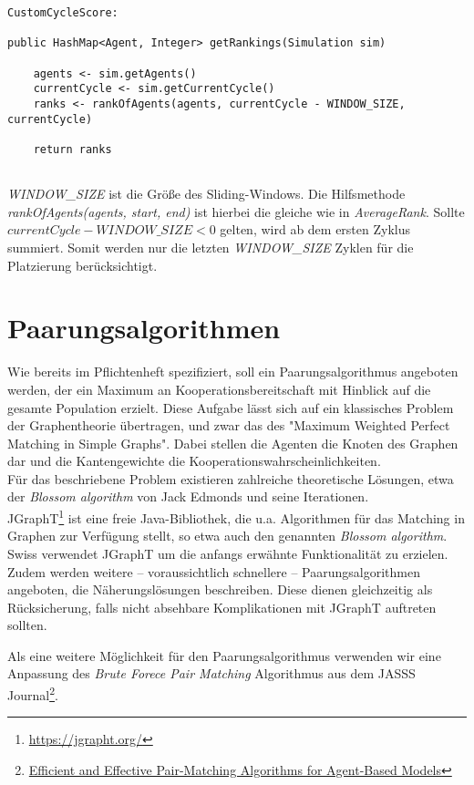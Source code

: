 \begin{lstlisting}
CustomCycleScore:

public HashMap<Agent, Integer> getRankings(Simulation sim) 
	
	agents <- sim.getAgents()
	currentCycle <- sim.getCurrentCycle()
	ranks <- rankOfAgents(agents, currentCycle - WINDOW_SIZE, currentCycle)
	
	return ranks
	
\end{lstlisting}
\emph{WINDOW\_SIZE} ist die Größe des Sliding-Windows. Die Hilfsmethode \emph{rankOfAgents(agents, start, end)} ist hierbei die gleiche wie in \emph{AverageRank}. Sollte $currentCycle - WINDOW\_SIZE < 0$ gelten, wird ab dem ersten Zyklus summiert. Somit werden nur die letzten \emph{WINDOW\_SIZE} Zyklen für die Platzierung berücksichtigt. 


\section{Paarungsalgorithmen}

Wie bereits im Pflichtenheft spezifiziert, soll ein Paarungsalgorithmus angeboten werden, der ein Maximum an Kooperationsbereitschaft mit Hinblick auf die gesamte Population erzielt. Diese Aufgabe lässt sich auf ein klassisches Problem der Graphentheorie übertragen, und zwar das des "Maximum Weighted Perfect Matching in Simple Graphs". Dabei stellen die Agenten die Knoten des Graphen dar und die Kantengewichte die Kooperationswahrscheinlichkeiten.\\
Für das beschriebene Problem existieren zahlreiche theoretische Lösungen, etwa der \emph{Blossom algorithm} von Jack Edmonds und seine Iterationen.\\
JGraphT\footnote{\href{https://jgrapht.org/}{https://jgrapht.org/}} ist eine freie Java-Bibliothek, die u.a. Algorithmen für das Matching in Graphen zur Verfügung stellt, so etwa auch den genannten \emph{Blossom algorithm}.\\
Swiss verwendet JGraphT um die anfangs erwähnte Funktionalität zu erzielen. Zudem werden weitere – voraussichtlich schnellere – Paarungsalgorithmen angeboten, die Näherungslösungen beschreiben. Diese dienen gleichzeitig als Rücksicherung, falls nicht absehbare Komplikationen mit JGraphT auftreten sollten.


Als eine weitere Möglichkeit für den Paarungsalgorithmus verwenden wir eine Anpassung des \emph{Brute Forece Pair Matching} Algorithmus aus dem JASSS Journal\footnote{\href{http://jasss.soc.surrey.ac.uk/20/4/8.html}{Efficient and Effective Pair-Matching Algorithms for Agent-Based Models}}. 

